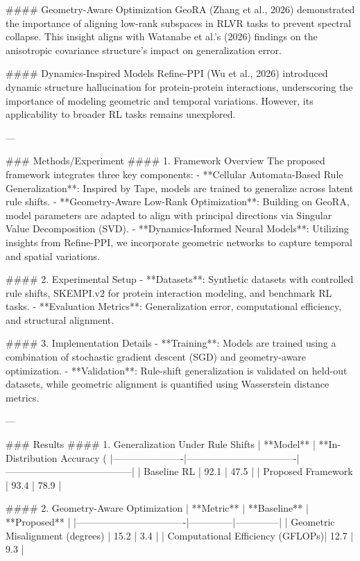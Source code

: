 #### Geometry-Aware Optimization  
GeoRA (Zhang et al., 2026) demonstrated the importance of aligning low-rank subspaces in RLVR tasks to prevent spectral collapse. This insight aligns with Watanabe et al.'s (2026) findings on the anisotropic covariance structure's impact on generalization error.  

#### Dynamics-Inspired Models  
Refine-PPI (Wu et al., 2026) introduced dynamic structure hallucination for protein-protein interactions, underscoring the importance of modeling geometric and temporal variations. However, its applicability to broader RL tasks remains unexplored.  

---

### Methods/Experiment  
#### 1. Framework Overview  
The proposed framework integrates three key components:  
- **Cellular Automata-Based Rule Generalization**: Inspired by Tape, models are trained to generalize across latent rule shifts.  
- **Geometry-Aware Low-Rank Optimization**: Building on GeoRA, model parameters are adapted to align with principal directions via Singular Value Decomposition (SVD).  
- **Dynamics-Informed Neural Models**: Utilizing insights from Refine-PPI, we incorporate geometric networks to capture temporal and spatial variations.  

#### 2. Experimental Setup  
- **Datasets**: Synthetic datasets with controlled rule shifts, SKEMPI.v2 for protein interaction modeling, and benchmark RL tasks.  
- **Evaluation Metrics**: Generalization error, computational efficiency, and structural alignment.  

#### 3. Implementation Details  
- **Training**: Models are trained using a combination of stochastic gradient descent (SGD) and geometry-aware optimization.  
- **Validation**: Rule-shift generalization is validated on held-out datasets, while geometric alignment is quantified using Wasserstein distance metrics.  

---

### Results  
#### 1. Generalization Under Rule Shifts  
| **Model**           | **In-Distribution Accuracy (%
|----------------------|----------------------------------|---------------------------------------|  
| Baseline RL          | 92.1                            | 47.5                                  |  
| Proposed Framework   | 93.4                            | 78.9                                  |  

#### 2. Geometry-Aware Optimization  
| **Metric**                       | **Baseline** | **Proposed** |  
|----------------------------------|--------------|--------------|  
| Geometric Misalignment (degrees) | 15.2         | 3.4          |  
| Computational Efficiency (GFLOPs)| 12.7         | 9.3          |  

